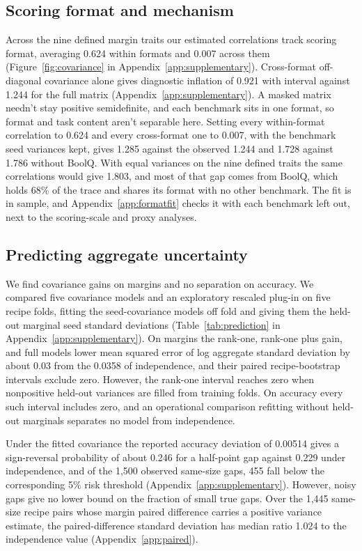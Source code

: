 \subsection{Scoring format and mechanism}
Across the nine defined margin traits our estimated correlations track scoring format, averaging 0.624 within formats and 0.007 across them (Figure~\ref{fig:covariance} in Appendix~\ref{app:supplementary}). Cross-format off-diagonal covariance alone gives diagnostic inflation of 0.921 with interval  against 1.244 for the full matrix (Appendix~\ref{app:supplementary}). A masked matrix needn't stay positive semidefinite, and each benchmark sits in one format, so format and task content aren't separable here. Setting every within-format correlation to 0.624 and every cross-format one to 0.007, with the benchmark seed variances kept, gives 1.285 against the observed 1.244 and 1.728 against 1.786 without BoolQ. With equal variances on the nine defined traits the same correlations would give 1.803, and most of that gap comes from BoolQ, which holds 68\% of the trace and shares its format with no other benchmark. The fit is in sample, and Appendix~\ref{app:formatfit} checks it with each benchmark left out, next to the scoring-scale and proxy analyses.

\subsection{Predicting aggregate uncertainty}
\label{sec:prediction}
We find covariance gains on margins and no separation on accuracy. We compared five covariance models and an exploratory rescaled plug-in on five recipe folds, fitting the seed-covariance models off fold and giving them the held-out marginal seed standard deviations (Table~\ref{tab:prediction} in Appendix~\ref{app:supplementary}). On margins the rank-one, rank-one plus gain, and full models lower mean squared error of log aggregate standard deviation by about 0.03 from the 0.0358 of independence, and their paired recipe-bootstrap intervals exclude zero. However, the rank-one interval reaches zero when nonpositive held-out variances are filled from training folds. On accuracy every such interval includes zero, and an operational comparison refitting without held-out marginals separates no model from independence.

Under the fitted covariance the reported accuracy deviation of 0.00514 gives a sign-reversal probability of about 0.246 for a half-point gap against 0.229 under independence, and of the 1,500 observed same-size gaps, 455 fall below the corresponding 5\% risk threshold (Appendix~\ref{app:supplementary}). However, noisy gaps give no lower bound on the fraction of small true gaps. Over the 1,445 same-size recipe pairs whose margin paired difference carries a positive variance estimate, the paired-difference standard deviation has median ratio 1.024 to the independence value (Appendix~\ref{app:paired}).

